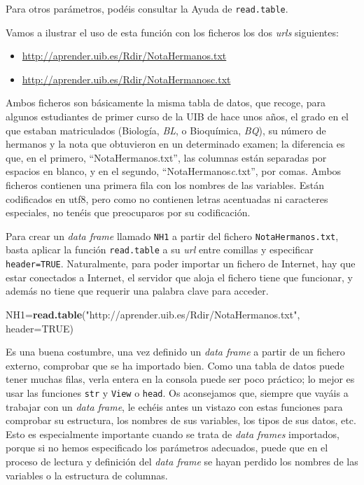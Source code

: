 \documentclass[
]{book}
\newenvironment{Shaded}{\begin{snugshade}}{\end{snugshade}}
\newcommand{\DataTypeTok}[1]{\textcolor[rgb]{0.13,0.29,0.53}{#1}}
\newcommand{\KeywordTok}[1]{\textcolor[rgb]{0.13,0.29,0.53}{\textbf{#1}}}
\newcommand{\NormalTok}[1]{#1}
\newcommand{\OtherTok}[1]{\textcolor[rgb]{0.56,0.35,0.01}{#1}}
\newcommand{\StringTok}[1]{\textcolor[rgb]{0.31,0.60,0.02}{#1}}
\providecommand{\tightlist}{%
  \setlength{\itemsep}{0pt}\setlength{\parskip}{0pt}}
\theoremstyle{definition}
\theoremstyle{definition}
\theoremstyle{definition}
\theoremstyle{remark}
\begin{document}
Para otros parámetros, podéis consultar la Ayuda de \texttt{read.table}.

Vamos a ilustrar el uso de esta función con los ficheros los dos \emph{urls} siguientes:

\begin{itemize}
\tightlist
\item
  \url{http://aprender.uib.es/Rdir/NotaHermanos.txt}
\item
  \url{http://aprender.uib.es/Rdir/NotaHermanosc.txt}
\end{itemize}

Ambos ficheros son básicamente la misma tabla de datos, que recoge, para algunos estudiantes de primer curso de la UIB de hace unos años, el grado en el que estaban matriculados (Biología, \emph{BL}, o Bioquímica, \emph{BQ}), su número de hermanos y la nota que obtuvieron en un determinado examen; la diferencia es que, en el primero, ``NotaHermanos.txt'', las columnas están separadas por espacios en blanco, y en el segundo, ``NotaHermanos\emph{c}.txt'', por comas. Ambos ficheros contienen una primera fila con los nombres de las variables. Están codificados en utf8, pero como no contienen letras acentuadas ni caracteres especiales, no tenéis que preocuparos por su codificación.

Para crear un \emph{data frame} llamado \texttt{NH1} a partir del fichero \texttt{NotaHermanos.txt}, basta aplicar la función \texttt{read.table} a su \emph{url} entre comillas y especificar \texttt{header=TRUE}. Naturalmente, para poder importar un fichero de Internet, hay que estar conectados a Internet, el servidor que aloja el fichero tiene que funcionar, y además no tiene que requerir una palabra clave para acceder.

\begin{Shaded}
\begin{Highlighting}[]
\NormalTok{NH1=}\KeywordTok{read.table}\NormalTok{(}\StringTok{"http://aprender.uib.es/Rdir/NotaHermanos.txt"}\NormalTok{, }\DataTypeTok{header=}\OtherTok{TRUE}\NormalTok{)}
\end{Highlighting}
\end{Shaded}

Es una buena costumbre, una vez definido un \emph{data frame} a partir de un fichero externo, comprobar que se ha importado bien. Como una tabla de datos puede tener muchas filas, verla entera en la consola puede ser poco práctico; lo mejor es usar las funciones \texttt{str} y \texttt{View} o \texttt{head}. Os aconsejamos que, siempre que vayáis a trabajar con un \emph{data frame}, le echéis antes un vistazo con estas funciones para comprobar su estructura, los nombres de sus variables, los tipos de sus datos, etc. Esto es especialmente importante cuando se trata de \emph{data frames} importados, porque si no hemos especificado los parámetros adecuados, puede que en el proceso de lectura y definición del \emph{data frame} se hayan perdido los nombres de las variables o la estructura de columnas.
\end{document}
